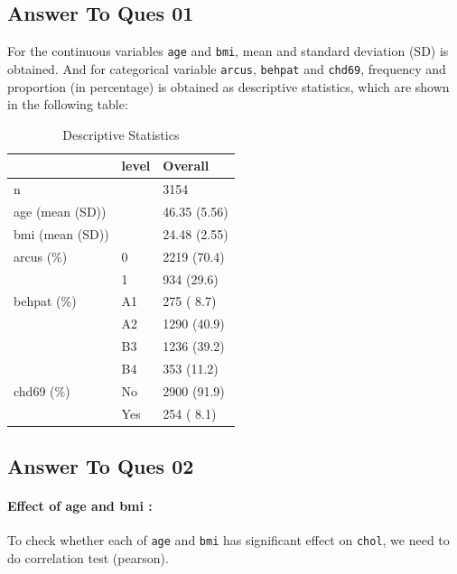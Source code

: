 \documentclass[
  12pt,
  oneside]{article}
\begin{document}
\hypertarget{answer-to-ques-01}{%
\subsection{Answer To Ques 01}\label{answer-to-ques-01}}

For the continuous variables \texttt{age} and \texttt{bmi}, mean and standard deviation (SD) is obtained. And for categorical variable \texttt{arcus}, \texttt{behpat} and \texttt{chd69}, frequency and proportion (in percentage) is obtained as descriptive statistics, which are shown in the following table:

\begin{table}[!h]

\caption{\label{tab:Table-01}Descriptive Statistics}
\centering
\begin{tabular}[t]{lll}
\toprule
  & level & Overall\\
\midrule
n &  & 3154\\
age (mean (SD)) &  & 46.35 (5.56)\\
bmi (mean (SD)) &  & 24.48 (2.55)\\
arcus (\%) & 0 & 2219 (70.4)\\
 & 1 & 934 (29.6)\\
\addlinespace
behpat (\%) & A1 & 275 ( 8.7)\\
 & A2 & 1290 (40.9)\\
 & B3 & 1236 (39.2)\\
 & B4 & 353 (11.2)\\
chd69 (\%) & No & 2900 (91.9)\\
\addlinespace
 & Yes & 254 ( 8.1)\\
\bottomrule
\end{tabular}
\end{table}

\clearpage

\hypertarget{answer-to-ques-02}{%
\subsection{Answer To Ques 02}\label{answer-to-ques-02}}

\hypertarget{effect-of-age-and-bmi}{%
\paragraph{Effect of age and bmi :}\label{effect-of-age-and-bmi}}

To check whether each of \texttt{age} and \texttt{bmi} has significant effect on \texttt{chol}, we need to do correlation test (pearson).
\end{document}
